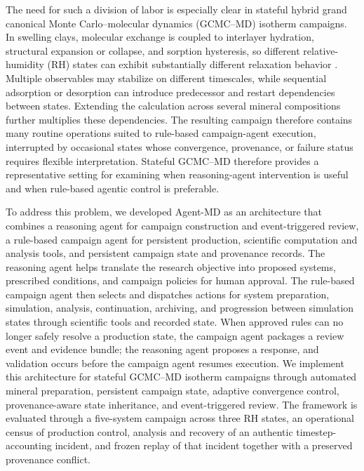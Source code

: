The need for such a division of labor is especially clear in stateful hybrid grand canonical Monte Carlo--molecular dynamics (GCMC--MD) isotherm campaigns. In swelling clays, molecular exchange is coupled to interlayer hydration, structural expansion or collapse, and sorption hysteresis, so different relative-humidity (RH) states can exhibit substantially different relaxation behavior \cite{wang2025ca,li2019montmorillonite}. Multiple observables may stabilize on different timescales, while sequential adsorption or desorption can introduce predecessor and restart dependencies between states. Extending the calculation across several mineral compositions further multiplies these dependencies. The resulting campaign therefore contains many routine operations suited to rule-based campaign-agent execution, interrupted by occasional states whose convergence, provenance, or failure status requires flexible interpretation. Stateful GCMC--MD therefore provides a representative setting for examining when reasoning-agent intervention is useful and when rule-based agentic control is preferable.

To address this problem, we developed Agent-MD as an architecture that combines a reasoning agent for campaign construction and event-triggered review, a rule-based campaign agent for persistent production, scientific computation and analysis tools, and persistent campaign state and provenance records. The reasoning agent helps translate the research objective into proposed systems, prescribed conditions, and campaign policies for human approval. The rule-based campaign agent then selects and dispatches actions for system preparation, simulation, analysis, continuation, archiving, and progression between simulation states through scientific tools and recorded state. When approved rules can no longer safely resolve a production state, the campaign agent packages a review event and evidence bundle; the reasoning agent proposes a response, and validation occurs before the campaign agent resumes execution. We implement this architecture for stateful GCMC--MD isotherm campaigns through automated mineral preparation, persistent campaign state, adaptive convergence control, provenance-aware state inheritance, and event-triggered review. The framework is evaluated through a five-system campaign across three RH states, an operational census of production control, analysis and recovery of an authentic timestep-accounting incident, and frozen replay of that incident together with a preserved provenance conflict.
